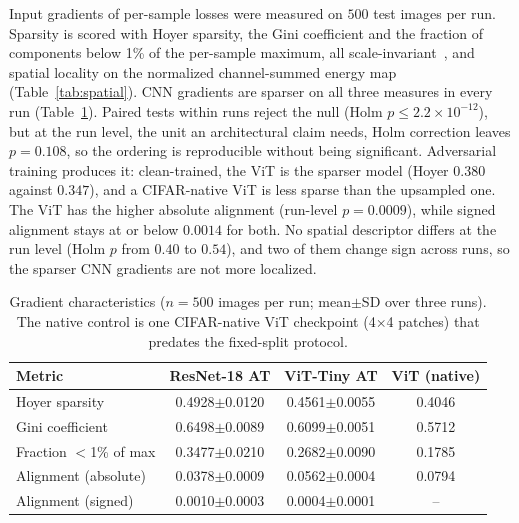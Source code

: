 Input gradients of per-sample losses were measured on $500$ test images per run. Sparsity is scored with Hoyer sparsity, the Gini coefficient and the fraction of components below 1\% of the per-sample maximum, all scale-invariant~\cite{hurley2009comparing}, and spatial locality on the normalized channel-summed energy map (Table~\ref{tab:spatial}). CNN gradients are sparser on all three measures in every run (Table~\ref{tab:gradient}). Paired tests within runs reject the null (Holm $p \leq 2.2\times10^{-12}$), but at the run level, the unit an architectural claim needs, Holm correction leaves $p = 0.108$, so the ordering is reproducible without being significant. Adversarial training produces it: clean-trained, the ViT is the sparser model (Hoyer $0.380$ against $0.347$), and a CIFAR-native ViT is less sparse than the upsampled one. The ViT has the higher absolute alignment (run-level $p = 0.0009$), while signed alignment stays at or below $0.0014$ for both. No spatial descriptor differs at the run level (Holm $p$ from $0.40$ to $0.54$), and two of them change sign across runs, so the sparser CNN gradients are not more localized.

\begin{table}[!t]
\centering
\caption{Gradient characteristics ($n=500$ images per run; mean$\pm$SD over three runs). The native control is one CIFAR-native ViT checkpoint (4$\times$4 patches) that predates the fixed-split protocol.}
\label{tab:gradient}
\footnotesize
\setlength{\tabcolsep}{2.5pt}
\begin{tabular}{lccc}
\toprule
\textbf{Metric} & \textbf{ResNet-18 AT} & \textbf{ViT-Tiny AT} & \textbf{ViT (native)} \\
\midrule
Hoyer sparsity & 0.4928$\pm$0.0120 & 0.4561$\pm$0.0055 & 0.4046 \\
Gini coefficient & 0.6498$\pm$0.0089 & 0.6099$\pm$0.0051 & 0.5712 \\
Fraction $<$1\% of max & 0.3477$\pm$0.0210 & 0.2682$\pm$0.0090 & 0.1785 \\
Alignment (absolute) & 0.0378$\pm$0.0009 & 0.0562$\pm$0.0004 & 0.0794 \\
Alignment (signed) & 0.0010$\pm$0.0003 & 0.0004$\pm$0.0001 & -- \\
\bottomrule
\end{tabular}
\end{table}

